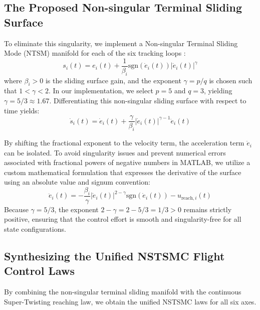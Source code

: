 \subsection{The Proposed Non-singular Terminal Sliding Surface}
To eliminate this singularity, we implement a Non-singular Terminal Sliding Mode (NTSM) manifold for each of the six tracking loops \cite{ref_75}:
\begin{equation}
s_i(t) = e_i(t) + \frac{1}{\beta_i} \text{sgn}(\dot{e}_i(t)) |\dot{e}_i(t)|^{\gamma}
\end{equation}
where $\beta_i > 0$ is the sliding surface gain, and the exponent $\gamma = p/q$ is chosen such that $1 < \gamma < 2$. In our implementation, we select $p = 5$ and $q = 3$, yielding $\gamma = 5/3 \approx 1.67$. Differentiating this non-singular sliding surface with respect to time yields:
\begin{equation}
\dot{s}_i(t) = \dot{e}_i(t) + \frac{\gamma}{\beta_i} |\dot{e}_i(t)|^{\gamma - 1} \ddot{e}_i(t)
\end{equation}

By shifting the fractional exponent to the velocity term, the acceleration term $\ddot{e}_i$ can be isolated. To avoid singularity issues and prevent numerical errors associated with fractional powers of negative numbers in MATLAB, we utilize a custom mathematical formulation that expresses the derivative of the surface using an absolute value and signum convention:
\begin{equation}
\ddot{e}_i(t) = -\frac{\beta_i}{\gamma} |\dot{e}_i(t)|^{2 - \gamma} \text{sgn}(\dot{e}_i(t)) - u_{\text{reach},i}(t)
\end{equation}
Because $\gamma = 5/3$, the exponent $2 - \gamma = 2 - 5/3 = 1/3 > 0$ remains strictly positive, ensuring that the control effort is smooth and singularity-free for all state configurations.

\subsection{Synthesizing the Unified NSTSMC Flight Control Laws}
By combining the non-singular terminal sliding manifold with the continuous Super-Twisting reaching law, we obtain the unified NSTSMC laws for all six axes.

